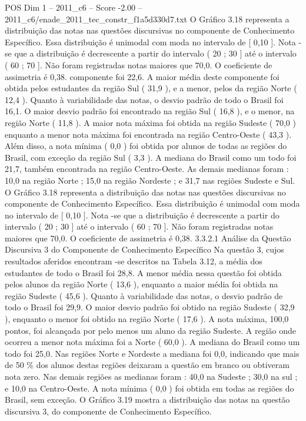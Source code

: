 \begin{textsample}{POS Dim 1 – 2011\_c6 – Score -2.00 – 2011\_c6/enade\_2011\_tec\_constr\_f1a5d330d7.txt}
O Gráfico 3.18 representa a distribuição das notas nas questões discursivas no componente de Conhecimento Específico.
Essa distribuição é unimodal com moda no intervalo de [ 0,10 ].
Nota -se que a distribuição é decrescente a partir do intervalo ( 20 ; 30 ] até o intervalo ( 60 ; 70 ].
Não foram registradas notas maiores que 70,0.
O coeficiente de assimetria é 0,38. componente foi 22,6.
A maior média deste componente foi obtida pelos estudantes da região Sul ( 31,9 ), e a menor, pelos da região Norte ( 12,4 ).
Quanto à variabilidade das notas, o desvio padrão de todo o Brasil foi 16,1.
O maior desvio padrão foi encontrado na região Sul ( 16,8 ), e o menor, na região Norte ( 11,8 ).
A maior nota máxima foi obtida na região Sudeste ( 70,0 ) enquanto a menor nota máxima foi encontrada na região Centro-Oeste ( 43,3 ).
Além disso, a nota mínima ( 0,0 ) foi obtida por alunos de todas as regiões do Brasil, com exceção da região Sul ( 3,3 ).
A mediana do Brasil como um todo foi 21,7, também encontrada na região Centro-Oeste.
As demais medianas foram : 10,0 na região Norte ; 15,0 na região Nordeste ; e 31,7 nas regiões Sudeste e Sul.
O Gráfico 3.18 representa a distribuição das notas nas questões discursivas no componente de Conhecimento Específico.
Essa distribuição é unimodal com moda no intervalo de [ 0,10 ].
Nota -se que a distribuição é decrescente a partir do intervalo ( 20 ; 30 ] até o intervalo ( 60 ; 70 ].
Não foram registradas notas maiores que 70,0.
O coeficiente de assimetria é 0,38. 3.3.2.1 Análise da Questão Discursiva 3 do Componente de Conhecimento Específico Na questão 3, cujos resultados aferidos encontram -se descritos na Tabela 3.12, a média dos estudantes de todo o Brasil foi 28,8.
A menor média nessa questão foi obtida pelos alunos da região Norte ( 13,6 ), enquanto a maior média foi obtida na região Sudeste ( 45,6 ).
Quanto à variabilidade das notas, o desvio padrão de todo o Brasil foi 29,9.
O maior desvio padrão foi obtido na região Sudeste ( 32,9 ), enquanto o menor foi obtido na região Norte ( 17,6 ).
A nota máxima, 100,0 pontos, foi alcançada por pelo menos um aluno da região Sudeste.
A região onde ocorreu a menor nota máxima foi a Norte ( 60,0 ).
A mediana do Brasil como um todo foi 25,0.
Nas regiões Norte e Nordeste a mediana foi 0,0, indicando que mais de 50 \% dos alunos destas regiões deixaram a questão em branco ou obtiveram nota zero.
Nas demais regiões as medianas foram : 40,0 na Sudeste ; 30,0 na sul ; e 10,0 na Centro-Oeste.
A nota mínima ( 0,0 ) foi obtida em todas as regiões do Brasil, sem exceção.
O Gráfico 3.19 mostra a distribuição das notas na questão discursiva 3, do componente de Conhecimento Específico.

\end{textsample}
